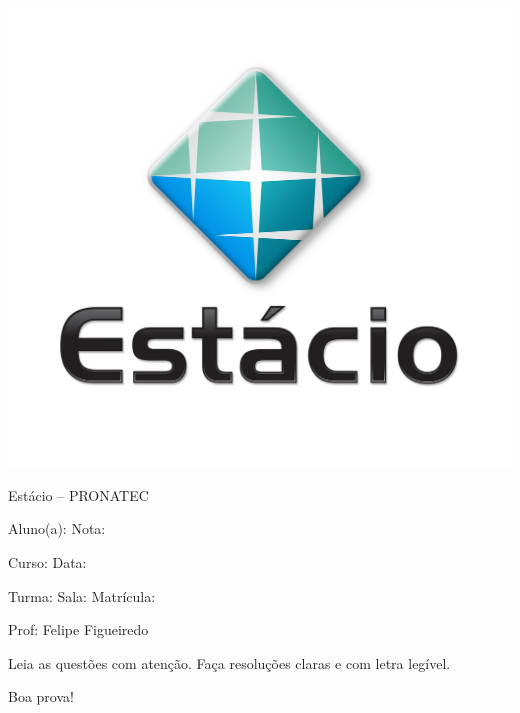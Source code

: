 \documentclass[a4paper]{article}
\begin{document}
\noindent\parbox[c]{.15\textwidth}{\includegraphics[width=.15\textwidth]{logo}}\hfill
\parbox[c]{.825\textwidth}{\raggedright%
{Estácio -- PRONATEC\par} 

{Aluno(a): \underline{\hspace{8.5cm}} Nota: \underline{\hspace{2cm}}\par}%
{Curso: \underline{\hspace{8.95cm}} Data: \underline{\hspace{2cm}}\par}
{Turma: \underline{\hspace{2cm}} Sala: \underline{\hspace{2cm}}
  Matrícula: \underline{\hspace{4cm}} \par}
{Prof: Felipe Figueiredo\par}

\vspace{1cm}
}

Leia as questões com atenção. Faça resoluções claras e com letra
legível. 

Boa prova!

\underline{\hspace{15.5cm}}

\end{document}
